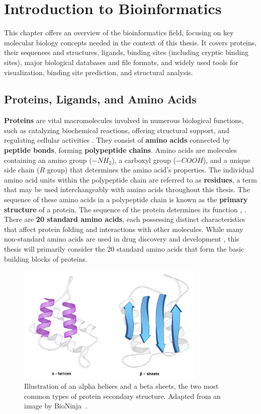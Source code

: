 \chapter{Introduction to Bioinformatics}
\label{chap:intro}

This chapter offers an overview of the bioinformatics field, focusing on key molecular biology concepts needed in the context of this thesis. It covers proteins, their sequences and structures, ligands, binding sites (including cryptic binding sites), major biological databases and file formats, and widely used tools for visualization, binding site prediction, and structural analysis.

\section{Proteins, Ligands, and Amino Acids}
\label{sec:proteins}

\textbf{Proteins} are vital macromolecules involved in numerous biological functions, such as catalyzing biochemical reactions, offering structural support, and regulating cellular activities \cite{cooper2022cell}. They consist of \textbf{amino acids} connected by \textbf{peptide bonds}, forming \textbf{polypeptide chains}. Amino acids are molecules containing an amino group (\(-NH_2\)), a carboxyl group (\(-COOH\)), and a unique side chain (\(R\) group) that determines the amino acid's properties. The individual amino acid units within the polypeptide chain are referred to as \textbf{residues}, a term that may be used interchangeably with amino acids throughout this thesis. The sequence of these amino acids in a polypeptide chain is known as the \textbf{primary structure} of a protein. The sequence of the protein determines its function \cite{nelson2008lehninger}, \cite{voet2010biochemistry}. There are \textbf{20 standard amino acids}, each possessing distinct characteristics that affect protein folding and interactions with other molecules. While many non-standard amino acids are used in drug discovery and development \cite{dumas2015designing}, this thesis will primarily consider the 20 standard amino acids that form the basic building blocks of proteins.

\begin{figure}[ht]
    \centering
    \includegraphics[width=0.8\textwidth]{img/ah_bs.png}
    \caption{Illustration of an alpha helices and a beta sheets, the two most common types of protein secondary structure. Adapted from an image by BioNinja~\cite{alphabetapicture}.}
    \label{fig:alpha-beta}
\end{figure}

